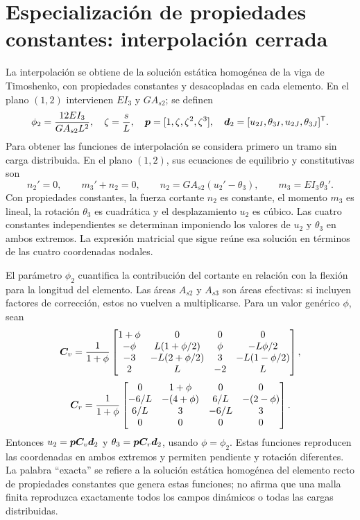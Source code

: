 \section{Especialización de propiedades constantes: interpolación cerrada}

La interpolación se obtiene de la solución estática homogénea de la viga de
Timoshenko, con propiedades constantes y desacopladas en cada elemento.
En el plano $(1,2)$ intervienen $EI_3$ y
$GA_{s2}$; se definen
\begin{equation}
 \phi_2=\frac{12EI_3}{GA_{s2}L^2},\quad
 \zeta=\frac{s}{L},\quad
 \bm{p}=[1,\zeta,\zeta^2,\zeta^3],\quad
 \bm{d}_2=[u_{2I},\theta_{3I},u_{2J},\theta_{3J}]^{\mathsf T}.
\end{equation}
Para obtener las funciones de interpolación se considera primero un tramo sin carga distribuida. En el plano $(1,2)$, sus ecuaciones de equilibrio y constitutivas son
\begin{equation}
 n_2'=0,\qquad m_3'+n_2=0,\qquad
 n_2=GA_{s2}(u_2'-\theta_3),\qquad m_3=EI_3\theta_3'.
\end{equation}
Con propiedades constantes, la fuerza cortante $n_2$ es constante, el momento $m_3$ es lineal, la rotación $\theta_3$ es cuadrática y el desplazamiento $u_2$ es cúbico. Las cuatro constantes independientes se determinan imponiendo los valores de $u_2$ y $\theta_3$ en ambos extremos. La expresión matricial que sigue reúne esa solución en términos de las cuatro coordenadas nodales.

El parámetro $\phi_2$ cuantifica la contribución del cortante en relación con
la flexión para la longitud del elemento. Las áreas $A_{s2}$ y $A_{s3}$ son
áreas efectivas: si incluyen factores de corrección, estos no vuelven a
multiplicarse. Para un valor genérico $\phi$, sean
\begin{equation}
 \boldsymbol{C}_v=\frac{1}{1+\phi}
 \begin{bmatrix}
 1+\phi&0&0&0\\
 -\phi&L(1+\phi/2)&\phi&-L\phi/2\\
 -3&-L(2+\phi/2)&3&-L(1-\phi/2)\\
 2&L&-2&L
 \end{bmatrix},
\end{equation}
\begin{equation}
 \boldsymbol{C}_r=\frac{1}{1+\phi}
 \begin{bmatrix}
 0&1+\phi&0&0\\
 -6/L&-(4+\phi)&6/L&-(2-\phi)\\
 6/L&3&-6/L&3\\
 0&0&0&0
 \end{bmatrix}.
\end{equation}
Entonces $u_2=\bm{p}\boldsymbol{C}_v\bm{d}_2$ y
$\theta_3=\bm{p}\boldsymbol{C}_r\bm{d}_2$, usando $\phi=\phi_2$.
Estas funciones reproducen las coordenadas en ambos extremos y permiten
pendiente y rotación diferentes. La palabra ``exacta'' se refiere a la
solución estática homogénea del elemento recto de propiedades constantes que
genera estas funciones; no afirma que una malla finita reproduzca exactamente
todos los campos dinámicos o todas las cargas distribuidas.

